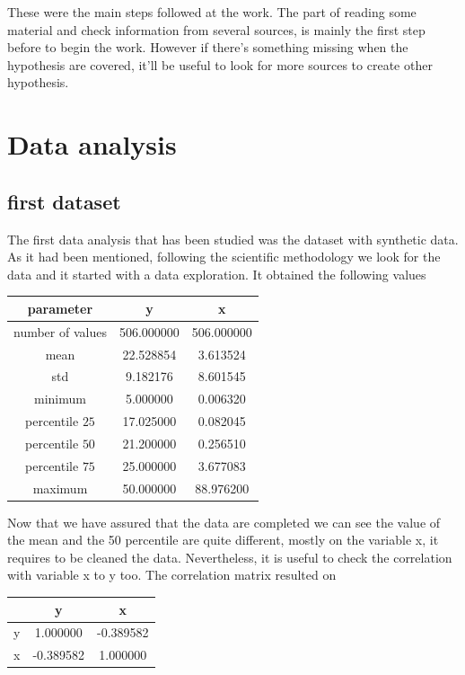 \documentclass{article}
\begin{document}
These were the main steps followed at the work. The part of reading some material and check information from several sources, is mainly the first step before to begin the work. However if there's something missing when the hypothesis are covered, it'll be useful to look for more sources to create other hypothesis.

\section{Data analysis}
\subsection{first dataset}
The first data analysis that has been studied was the dataset with synthetic data. As it had been mentioned, following the scientific methodology we look for the data and it started with a data exploration.
It obtained the following values 
\begin{center}
  \begin{tabular}{|c|c|c|}
    \hline
   parameter & y & x \\ \hline
   number of values & 506.000000 & 506.000000\\
   mean  &  22.528854  &  3.613524\\
   std   &   9.182176  &  8.601545\\
   minimum   &   5.000000  &  0.006320\\
   percentile $25$   &  17.025000  &  0.082045\\
   percentile $50$   &  21.200000  &  0.256510\\
   percentile $75$   &  25.000000 &   3.677083\\
   maximum   &  50.000000  & 88.976200\\
   \hline
  \end{tabular}
\end{center}
Now that we have assured that the data are completed we can see the value of the mean and the 50 percentile are quite different, mostly on the variable x, it requires to be cleaned the data. Nevertheless, it is useful to check the correlation with variable x to y too.
The correlation matrix resulted on 
\begin{center}
  \begin{tabular}{|c|c|c|}
    \hline
      & y & x  \\ \hline
     y&  1.000000 & -0.389582 \\
     x & -0.389582  & 1.000000 \\
     \hline
  \end{tabular}
\end{center}
\end{document}
